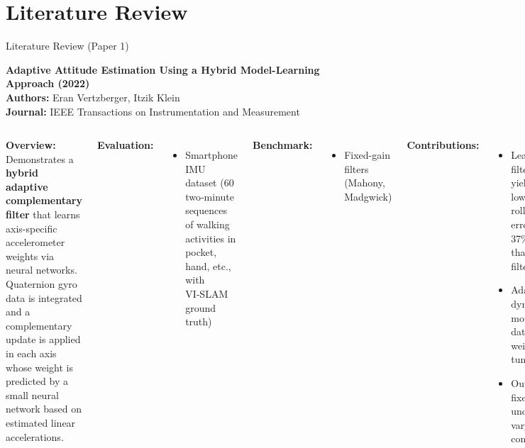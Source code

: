 \documentclass[aspectratio=169,xcolor=dvipsnames]{beamer}
\begin{document}
\section{Literature Review}

\begin{frame}{Literature Review (Paper 1)}

\textbf{Adaptive Attitude Estimation Using a Hybrid Model-Learning Approach (2022)} \hfill \textcolor{blue}{\cite{vertzberger2022adaptive}}\\
\textbf{Authors:} Eran Vertzberger, Itzik Klein \\
\textbf{Journal:} IEEE Transactions on Instrumentation and Measurement

\vspace{1em}
\scriptsize
\begin{columns}
    \textbf{Overview:}\\
    Demonstrates a \textbf{hybrid adaptive complementary filter} that learns axis-specific accelerometer weights via neural networks. Quaternion gyro data is integrated and a complementary update is applied in each axis whose weight is predicted by a small neural network based on estimated linear accelerations. 

    \vspace{0.5em}
    \textbf{Evaluation:}
    \begin{itemize}
        \item Smartphone IMU dataset (60 two‑minute sequences of walking activities in pocket, hand, etc., with VI‑SLAM ground truth)
    \end{itemize}
    
    \textbf{Benchmark:}
    \begin{itemize}
        \item Fixed-gain filters (Mahony\textcolor{blue}{\cite{mahony2008nonlinear}}, Madgwick\textcolor{blue}{\cite{madgwick2011estimation}})
    \end{itemize}

    \textbf{Contributions:}
    \begin{itemize}
        \item Learned filter (DAE) yielded the lowest roll/pitch errors (10–37\% better than classic filters).
        \item Adapts to dynamic motion via data-driven weight tuning.
        \item Outperforms fixed gains under varying conditions.
    \end{itemize}

    \vspace{0.5em}
    \textbf{Disadvantages:}
    \begin{itemize}
        \item Requires labeled training data and offline learning.
        \item Neural nets add complexity.
        \item Yaw is not addressed (no magnetometer fusion).
    \end{itemize}
\end{columns}

\end{frame}
\end{document}
